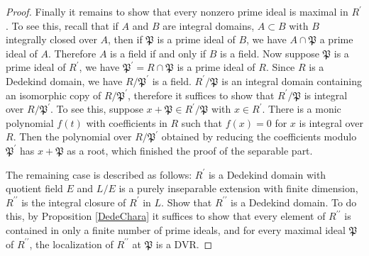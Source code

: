 \begin{proof}
Finally it remains to show that every nonzero prime ideal is maximal in $R^\prime$. To see this, recall that if $A$ and $B$ are integral domains, $A\subset B$ with $B$ integrally closed over $A$, then if $\mathfrak{P}$ is a prime ideal of $B$, we have $A\cap\mathfrak{P}$ a prime ideal of $A$. Therefore $A$ is a field if and only if $B$ is a field. Now suppose $\mathfrak{P}$ is a prime ideal of $R^\prime$, we have $\mathfrak{P}^\prime=R\cap\mathfrak{P}$ is a prime ideal of $R$. Since $R$ is a Dedekind domain, we have $R/\mathfrak{P}^\prime$ is a field. $R^\prime/\mathfrak{P}$ is an integral domain containing an isomorphic copy of $R/\mathfrak{P}^\prime$, therefore it suffices to show that $R^\prime/\mathfrak{P}$ is integral over $R/\mathfrak{P}^\prime$. To see this, suppose $x+\mathfrak{P}\in R^\prime/\mathfrak{P}$ with $x\in R^\prime$. There is a monic polynomial $f(t)$ with coefficients in $R$ such that $f(x)=0$ for $x$ is integral over $R$. Then the polynomial over $R/\mathfrak{P}^\prime$ obtained by reducing the coefficients modulo $\mathfrak{P}^\prime$ has $x+\mathfrak{P}$ as a root, which finished the proof of the separable part.\par
The remaining case is described as follows: $R^\prime$ is a Dedekind domain with quotient field $E$ and $L/E$ is a purely inseparable extension with finite dimension, $R^{\prime\prime}$ is the integral closure of $R^\prime$ in $L$. Show that $R^{\prime\prime}$ is a Dedekind domain. To do this, by Proposition \ref{DedeChara} it suffices to show that every element of $R^{\prime\prime}$ is contained in only a finite number of prime ideals, and for every maximal ideal $\mathfrak{P}$ of $R^{\prime\prime}$, the localization of $R^{\prime\prime}$ at $\mathfrak{P}$ is a DVR.\par

\end{proof}
